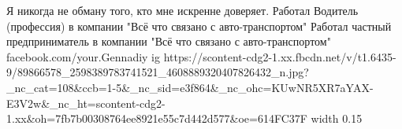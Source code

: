  
 
 
 
 

\par
Я никогда не обману того, кто мне искренне доверяет.
Работал Водитель (профессия) в компании "Всё что связано с авто-транспортом"
Работал частный предприниматель в компании "Всё что связано с авто-транспортом"
facebook.com/your.Gennadiy
\ifcmt
  ig https://scontent-cdg2-1.xx.fbcdn.net/v/t1.6435-9/89866578_2598389783741521_4608889320407826432_n.jpg?_nc_cat=108&ccb=1-5&_nc_sid=e3f864&_nc_ohc=KUwNR5XR7aYAX-E3V2w&_nc_ht=scontent-cdg2-1.xx&oh=7fb7b00308764ee8921e55c7d442d577&oe=614FC37F
  width 0.15
\fi

